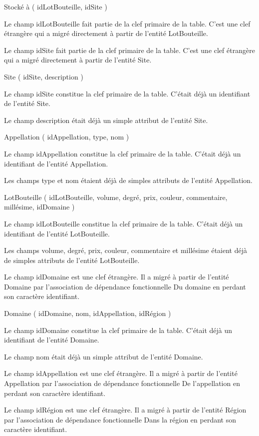 \documentclass[11pt]{article}
\begin{document}
    {Stocké à} ( {idLotBouteille}, {idSite} )

Le champ idLotBouteille fait partie de la clef primaire de la table.
C'est une clef étrangère qui a migré directement à partir de l'entité
LotBouteille.

Le champ idSite fait partie de la clef primaire de la table. C'est une
clef étrangère qui a migré directement à partir de l'entité Site.

{Site} ( {idSite}, {description} )

Le champ idSite constitue la clef primaire de la table. C'était déjà un
identifiant de l'entité Site.

Le champ description était déjà un simple attribut de l'entité Site.

{Appellation} ( {idAppellation}, {type}, {nom} )

Le champ idAppellation constitue la clef primaire de la table. C'était
déjà un identifiant de l'entité Appellation.

Les champs type et nom étaient déjà de simples attributs de l'entité
Appellation.

{LotBouteille} ( {idLotBouteille}, {volume}, {degré}, {prix}, {couleur},
{commentaire}, {millésime}, {idDomaine} )

Le champ idLotBouteille constitue la clef primaire de la table. C'était
déjà un identifiant de l'entité LotBouteille.

Les champs volume, degré, prix, couleur, commentaire et millésime
étaient déjà de simples attributs de l'entité LotBouteille.

Le champ idDomaine est une clef étrangère. Il a migré à partir de
l'entité Domaine par l'association de dépendance fonctionnelle Du
domaine en perdant son caractère identifiant.

{Domaine} ( {idDomaine}, {nom}, {idAppellation}, {idRégion} )

Le champ idDomaine constitue la clef primaire de la table. C'était déjà
un identifiant de l'entité Domaine.

Le champ nom était déjà un simple attribut de l'entité Domaine.

Le champ idAppellation est une clef étrangère. Il a migré à partir de
l'entité Appellation par l'association de dépendance fonctionnelle De
l'appellation en perdant son caractère identifiant.

Le champ idRégion est une clef étrangère. Il a migré à partir de
l'entité Région par l'association de dépendance fonctionnelle Dans la
région en perdant son caractère identifiant.
\end{document}
